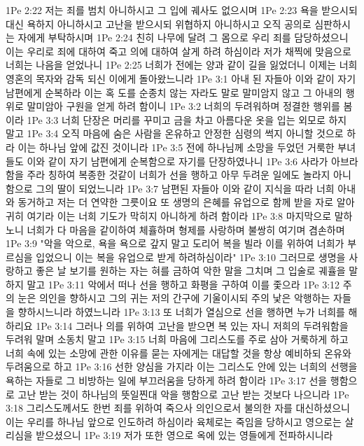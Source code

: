 1Pe 2:22  저는 죄를 범치 아니하시고 그 입에 궤사도 없으시며
1Pe 2:23  욕을 받으시되 대신 욕하지 아니하시고 고난을 받으시되 위협하지 아니하시고 오직 공의로 심판하시는 자에게 부탁하시며
1Pe 2:24  친히 나무에 달려 그 몸으로 우리 죄를 담당하셨으니 이는 우리로 죄에 대하여 죽고 의에 대하여 살게 하려 하심이라 저가 채찍에 맞음으로 너희는 나음을 얻었나니
1Pe 2:25  너희가 전에는 양과 같이 길을 잃었더니 이제는 너희 영혼의 목자와 감독 되신 이에게 돌아왔느니라
1Pe 3:1  아내 된 자들아 이와 같이 자기 남편에게 순복하라 이는 혹 도를 순종치 않는 자라도 말로 말미암지 않고 그 아내의 행위로 말미암아 구원을 얻게 하려 함이니
1Pe 3:2  너희의 두려워하며 정결한 행위를 봄이라
1Pe 3:3  너희 단장은 머리를 꾸미고 금을 차고 아름다운 옷을 입는 외모로 하지 말고
1Pe 3:4  오직 마음에 숨은 사람을 온유하고 안정한 심령의 썩지 아니할 것으로 하라 이는 하나님 앞에 값진 것이니라
1Pe 3:5  전에 하나님께 소망을 두었던 거룩한 부녀들도 이와 같이 자기 남편에게 순복함으로 자기를 단장하였나니
1Pe 3:6  사라가 아브라함을 주라 칭하여 복종한 것같이 너희가 선을 행하고 아무 두려운 일에도 놀라지 아니함으로 그의 딸이 되었느니라
1Pe 3:7  남편된 자들아 이와 같이 지식을 따라 너희 아내와 동거하고 저는 더 연약한 그릇이요 또 생명의 은혜를 유업으로 함께 받을 자로 알아 귀히 여기라 이는 너희 기도가 막히지 아니하게 하려 함이라
1Pe 3:8  마지막으로 말하노니 너희가 다 마음을 같이하여 체휼하며 형제를 사랑하며 불쌍히 여기며 겸손하며
1Pe 3:9  "악을 악으로, 욕을 욕으로 갚지 말고 도리어 복을 빌라 이를 위하여 너희가 부르심을 입었으니 이는 복을 유업으로 받게 하려하심이라"
1Pe 3:10  그러므로 생명을 사랑하고 좋은 날 보기를 원하는 자는 혀를 금하여 악한 말을 그치며 그 입술로 궤휼을 말하지 말고
1Pe 3:11  악에서 떠나 선을 행하고 화평을 구하여 이를 좇으라
1Pe 3:12  주의 눈은 의인을 향하시고 그의 귀는 저의 간구에 기울이시되 주의 낯은 악행하는 자들을 향하시느니라 하였느니라
1Pe 3:13  또 너희가 열심으로 선을 행하면 누가 너희를 해하리요
1Pe 3:14  그러나 의를 위하여 고난을 받으면 복 있는 자니 저희의 두려워함을 두려워 말며 소동치 말고
1Pe 3:15  너희 마음에 그리스도를 주로 삼아 거룩하게 하고 너희 속에 있는 소망에 관한 이유를 묻는 자에게는 대답할 것을 항상 예비하되 온유와 두려움으로 하고
1Pe 3:16  선한 양심을 가지라 이는 그리스도 안에 있는 너희의 선행을 욕하는 자들로 그 비방하는 일에 부끄러움을 당하게 하려 함이라
1Pe 3:17  선을 행함으로 고난 받는 것이 하나님의 뜻일찐대 악을 행함으로 고난 받는 것보다 나으니라
1Pe 3:18  그리스도께서도 한번 죄를 위하여 죽으사 의인으로서 불의한 자를 대신하셨으니 이는 우리를 하나님 앞으로 인도하려 하심이라 육체로는 죽임을 당하시고 영으로는 살리심을 받으셨으니
1Pe 3:19  저가 또한 영으로 옥에 있는 영들에게 전파하시니라

